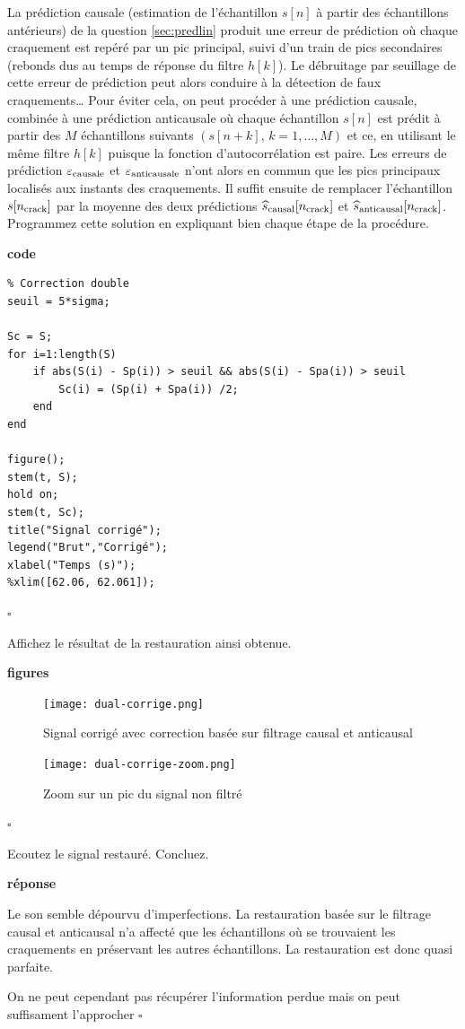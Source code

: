 \documentclass{article}
\newcommand{\debutrep}[1]{\color{blue}\begin{center} \hrulefill \textbf{ #1 } \hrulefill \end{center} }
\newcommand{\finrep}{\vspace*{5mm}\hfill $\square$\color{black}\vspace*{5mm}}
\begin{document}
La prédiction causale (estimation de l'échantillon $s[n]$ à partir des échantillons antérieurs) de la question \ref{sec:predlin} produit une erreur de prédiction où chaque craquement est repéré par un pic principal, suivi d'un train de pics secondaires (rebonds dus au temps de réponse du filtre $h[k]$). Le débruitage par seuillage de cette erreur de prédiction peut alors conduire à la détection de faux craquements\ldots
Pour éviter cela, on peut procéder à une prédiction causale, combinée à une prédiction anticausale où chaque échantillon 
$s[n]$ est prédit à partir des $M$ échantillons suivants $(s[n+k],\,k=1,\ldots,M)$ et ce, en utilisant le même filtre $h[k]$ puisque la fonction d'autocorrélation est paire. Les erreurs de prédiction $\varepsilon_{\rm causale}$ et $\varepsilon_{\rm anticausale}$ n'ont alors en commun que les pics principaux localisés aux instants des craquements. Il suffit ensuite de remplacer l'échantillon $s[n_{\rm crack}]$ par la moyenne des deux prédictions $\widehat{s}_{\rm causal}[n_{\rm crack}]$ et $\widehat{s}_{\rm anticausal}[n_{\rm crack}]$. \\

Programmez cette solution en expliquant bien chaque étape de la procédure. 

\debutrep{code}
\begin{verbatim}
% Correction double
seuil = 5*sigma;

Sc = S;
for i=1:length(S)
    if abs(S(i) - Sp(i)) > seuil && abs(S(i) - Spa(i)) > seuil
        Sc(i) = (Sp(i) + Spa(i)) /2;
    end
end

figure();
stem(t, S);
hold on;
stem(t, Sc);
title("Signal corrigé");
legend("Brut","Corrigé");
xlabel("Temps (s)");
%xlim([62.06, 62.061]);
\end{verbatim}
\finrep

Affichez le résultat de la restauration ainsi obtenue.

\debutrep{figures}
\begin{figure}[H]
    \texttt{[image: dual-corrige.png]}
    \caption{Signal corrigé avec correction basée sur filtrage causal et anticausal}
\end{figure}
\begin{figure}[H]
    \texttt{[image: dual-corrige-zoom.png]}
    \caption{Zoom sur un pic du signal non filtré}
\end{figure}
\finrep

Ecoutez le signal restauré. Concluez.

\debutrep{réponse}
Le son semble dépourvu d'imperfections. La restauration basée sur le filtrage causal et anticausal n'a affecté que les échantillons où se trouvaient les craquements en préservant les autres échantillons. La restauration est donc quasi parfaite.

On ne peut cependant pas récupérer l'information perdue mais on peut suffisament l'approcher 
\finrep
\end{document}

